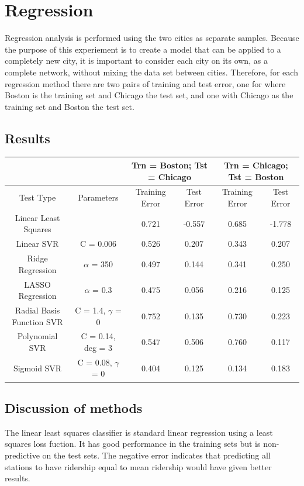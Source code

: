 \documentclass{article}
\begin{document}
\section{Regression}

Regression analysis is performed using the two cities as separate samples. Because the purpose of this experiement is to create a model that can be applied to a completely new city, it is important to consider each city on its own, as a complete network, without mixing the data set between cities. Therefore, for each regression method there are two pairs of training and test error, one for where Boston is the training set and Chicago the test set, and one with Chicago as the training set and Boston the test set. 

\subsection{Results}

\begin{center}\begin{tabular}{ c c c c c c}
\cline{3-6}
&&\multicolumn{2}{c}{Trn = Boston; Tst = Chicago}&\multicolumn{2}{c}{Trn = Chicago; Tst = Boston} \\ \hline
Test Type & Parameters & Training Error & Test Error &Training Error & Test Error \\
\hline\hline
Linear Least Squares & &0.721 & -0.557 & 0.685 & -1.778 \\
Linear SVR & C = 0.006& 0.526 & 0.207 & 0.343 & 0.207 \\
Ridge Regression & $\alpha$ = 350 &0.497 & 0.144 & 0.341 & 0.250 \\
LASSO Regression & $\alpha$ = 0.3&0.475 & 0.056 & 0.216 & 0.125 \\
Radial Basis Function SVR & C = 1.4, $\gamma$ = 0 &0.752& 0.135 & 0.730 & 0.223 \\
Polynomial SVR & C = 0.14, deg = 3& 0.547 & 0.506 & 0.760 & 0.117 \\
Sigmoid SVR & C = 0.08, $\gamma$ = 0& 0.404 & 0.125 & 0.134 & 0.183 \\
\end{tabular}\end{center}

\subsection{Discussion of methods}

The linear least squares classifier is standard linear regression using a least squares loss fuction. It has good performance in the training sets but is non-predictive on the test sets. The negative error indicates that predicting all stations to have ridership equal to mean ridership would have given better results.
\end{document}
